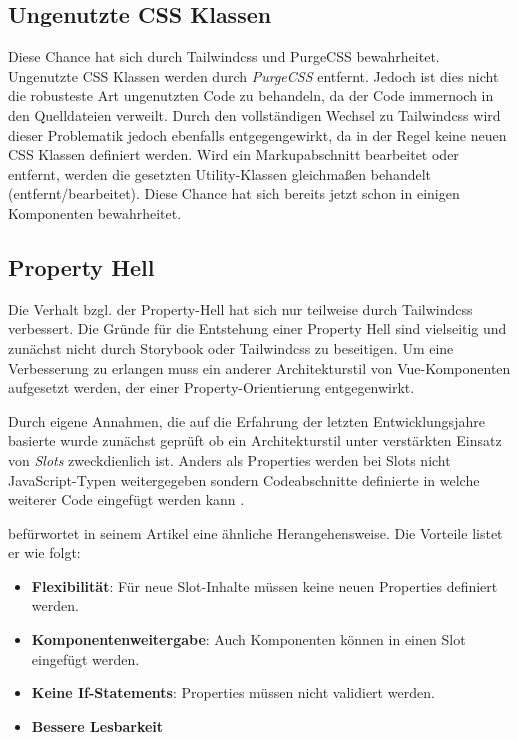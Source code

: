 \subsection{Ungenutzte CSS Klassen}
\label{subsec:unusedCSS}
Diese Chance hat sich durch Tailwindcss und PurgeCSS bewahrheitet. Ungenutzte CSS Klassen werden durch \textit{PurgeCSS} entfernt. Jedoch ist dies nicht die robusteste Art ungenutzten Code zu behandeln, da der Code immernoch in den Quelldateien verweilt. Durch den vollständigen Wechsel zu Tailwindcss wird dieser Problematik jedoch ebenfalls entgegengewirkt, da in der Regel keine neuen CSS Klassen definiert werden. Wird ein Markupabschnitt bearbeitet oder entfernt, werden die gesetzten Utility-Klassen gleichmaßen behandelt (entfernt/bearbeitet). Diese Chance hat sich bereits jetzt schon in einigen Komponenten bewahrheitet.

\subsection{Property Hell}
\label{sec:propertyHellSolution}
Die Verhalt bzgl. der Property-Hell hat sich nur teilweise durch Tailwindcss verbessert. Die Gründe für die Entstehung einer Property Hell sind vielseitig und zunächst nicht durch Storybook oder
Tailwindcss zu beseitigen. Um eine Verbesserung zu erlangen muss ein anderer Architekturstil von Vue-Komponenten aufgesetzt werden, der einer Property-Orientierung entgegenwirkt.

Durch eigene Annahmen, die auf die Erfahrung der letzten Entwicklungsjahre basierte wurde zunächst geprüft ob ein Architekturstil unter verstärkten Einsatz von \textit{Slots} zweckdienlich ist. Anders als Properties werden bei Slots nicht JavaScript-Typen weitergegeben sondern Codeabschnitte definierte in welche weiterer Code eingefügt werden kann \citep{VueDocsSlots}.

\cite{SlotsPropsArticle} befürwortet in seinem Artikel eine ähnliche Herangehensweise. Die Vorteile listet er wie folgt:

\begin{itemize}
  \item \textbf{Flexibilität}: Für neue Slot-Inhalte müssen keine neuen Properties definiert werden.
  \item \textbf{Komponentenweitergabe}: Auch Komponenten können in einen Slot eingefügt werden.
  \item \textbf{Keine If-Statements}: Properties müssen nicht validiert werden.
  \item \textbf{Bessere Lesbarkeit}
\end{itemize}

